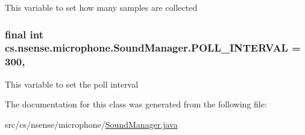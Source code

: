 This variable to set how many samples are collected \hypertarget{classcs_1_1nsense_1_1microphone_1_1_sound_manager_a8fda74d692b196fb3b2dc16a5ec23302}{
\subsubsection[{P\-O\-L\-L\-\_\-\-I\-N\-T\-E\-R\-V\-A\-L}]{\setlength{\rightskip}{0pt plus 5cm}final int cs.\-nsense.\-microphone.\-Sound\-Manager.\-P\-O\-L\-L\-\_\-\-I\-N\-T\-E\-R\-V\-A\-L = 300\hspace{0.3cm}{\ttfamily [static]}, {\ttfamily [private]}}}\label{classcs_1_1nsense_1_1microphone_1_1_sound_manager_a8fda74d692b196fb3b2dc16a5ec23302}
This variable to set the poll interval 

The documentation for this class was generated from the following file\-:\begin{DoxyCompactItemize}
\item 
src/cs/nsense/microphone/\hyperlink{_sound_manager_8java}{Sound\-Manager.\-java}\end{DoxyCompactItemize}
